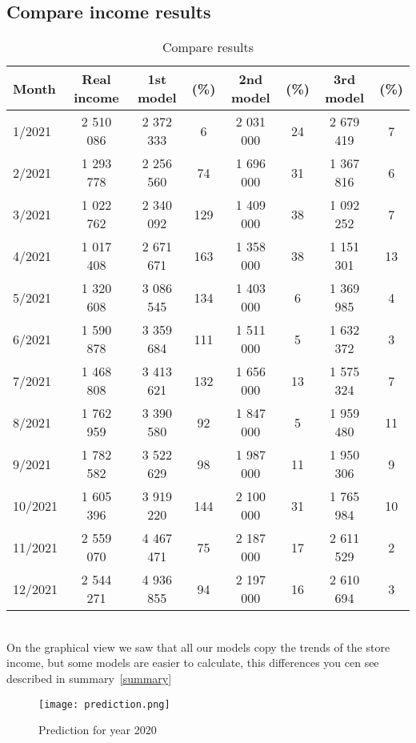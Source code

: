 \subsection{Compare income results} \label{compareresults}
\begin{table}[h!]
    \begin{center}
        \begin{tabular}{ | l | c | c | c | c | c | c | c |}
            \hline
            {\textbf{Month}} & \textbf{Real income} & \textbf{1st model} & \textbf{(\%)}  & \textbf{2nd model} & \textbf{(\%)} & \textbf{3rd model} & \textbf{(\%)}\\
            \hline
            1/2021 & 2 510 086 & 2 372 333 & 6 & 2 031 000 & 24 & 2 679 419 & 7\\
            2/2021 & 1 293 778 & 2 256 560 & 74 & 1 696 000 & 31 & 1 367 816 & 6\\
            3/2021 & 1 022 762 & 2 340 092 & 129 & 1 409 000 & 38 & 1 092 252 & 7\\
            4/2021 & 1 017 408 & 2 671 671 & 163 & 1 358 000 & 38 & 1 151 301 & 13\\
            5/2021 & 1 320 608 & 3 086 545 & 134 & 1 403 000 & 6 & 1 369 985 & 4\\
            6/2021 & 1 590 878 & 3 359 684 & 111 & 1 511 000 & 5 & 1 632 372 & 3\\
            7/2021 & 1 468 808 & 3 413 621 & 132 & 1 656 000 & 13 & 1 575 324 & 7\\
            8/2021 & 1 762 959 & 3 390 580 & 92 & 1 847 000 & 5 & 1 959 480 & 11\\
            9/2021 & 1 782 582 & 3 522 629 & 98 & 1 987 000 & 11 & 1 950 306 & 9\\
            10/2021 & 1 605 396 & 3 919 220 & 144 & 2 100 000 & 31 & 1 765 984 & 10\\
            11/2021 & 2 559 070 & 4 467 471 & 75 & 2 187 000 & 17 & 2 611 529 & 2\\
            12/2021 & 2 544 271 & 4 936 855 & 94 & 2 197 000 & 16 & 2 610 694 & 3\\
            \hline
        \end{tabular}
    \end{center}
    \caption{Compare results}
    \label{Compare results}
\end{table}\\
On the graphical view we saw that all our models copy the trends of the store income, but some models are easier to calculate, this differences you cen see described in summary~\ref{summary}
\begin{figure}[h!]
    \begin{center}
        \texttt{[image: prediction.png]}
    \end{center}
    \caption{Prediction for year 2020}
    \label{prediction}
\end{figure}\\
\newpage
